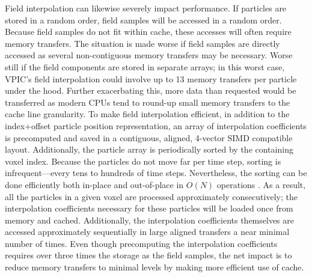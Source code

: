 \documentclass[10pt]{article}
\begin{document}
Field interpolation can likewise severely impact performance.  If
particles are stored in a random order, field samples will be accessed
in a random order.  Because field samples do not fit within cache,
these accesses will often require memory transfers.  The situation is
made worse if field samples are directly accessed as several
non-contiguous memory transfers may be necessary.  Worse still if the
field components are stored in separate arrays; in this worst case,
VPIC's field interpolation could involve up to 13 memory transfers per
particle under the hood.  Further exacerbating this, more data than
requested would be transferred as modern CPUs tend to round-up small
memory transfers to the cache line granularity.  To make field
interpolation efficient, in addition to the index+offset particle
position representation, an array of interpolation coefficients is
precomputed and saved in a contiguous, aligned, 4-vector SIMD
compatible layout.  Additionally, the particle array is periodically
sorted by the containing voxel index.  Because the particles do not
move far per time step, sorting is infrequent---every tens to hundreds
of time steps.  Nevertheless, the sorting can be done efficiently both
in-place and out-of-place in $O(N)$ operations \cite{Bowers_2001}.  As
a result, all the particles in a given voxel are processed
approximately consecutively; the interpolation coefficients necessary
for these particles will be loaded once from memory and cached.
Additionally, the interpolation coefficients themselves are accessed
approximately sequentially in large aligned transfers a near minimal
number of times.  Even though precomputing the interpolation
coefficients requires over three times the storage as the field
samples, the net impact is to reduce memory transfers to minimal
levels by making more efficient use of cache.

\end{document}

